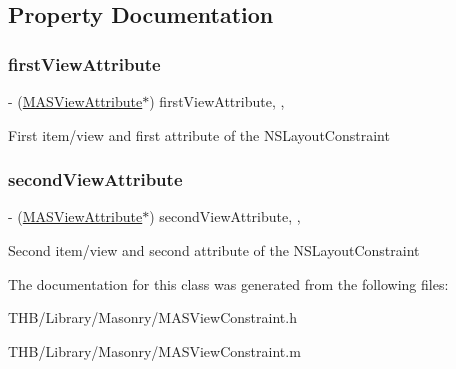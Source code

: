 \subsection{Property Documentation}
\mbox{\label{interface_m_a_s_view_constraint_a3185acee333665120fdc4700329aabc2}} 
\subsubsection{\texorpdfstring{first\+View\+Attribute}{firstViewAttribute}}
{\footnotesize\ttfamily -\/ (\mbox{\hyperlink{interface_m_a_s_view_attribute}{M\+A\+S\+View\+Attribute}}$\ast$) first\+View\+Attribute\hspace{0.3cm}{\ttfamily [read]}, {\ttfamily [nonatomic]}, {\ttfamily [strong]}}

First item/view and first attribute of the N\+S\+Layout\+Constraint \mbox{\label{interface_m_a_s_view_constraint_ad7c676556759c8787c84d5b51b4d6692}} 
\subsubsection{\texorpdfstring{second\+View\+Attribute}{secondViewAttribute}}
{\footnotesize\ttfamily -\/ (\mbox{\hyperlink{interface_m_a_s_view_attribute}{M\+A\+S\+View\+Attribute}}$\ast$) second\+View\+Attribute\hspace{0.3cm}{\ttfamily [read]}, {\ttfamily [nonatomic]}, {\ttfamily [strong]}}

Second item/view and second attribute of the N\+S\+Layout\+Constraint 

The documentation for this class was generated from the following files\+:\begin{DoxyCompactItemize}
\item 
T\+H\+B/\+Library/\+Masonry/M\+A\+S\+View\+Constraint.\+h\item 
T\+H\+B/\+Library/\+Masonry/M\+A\+S\+View\+Constraint.\+m\end{DoxyCompactItemize}
